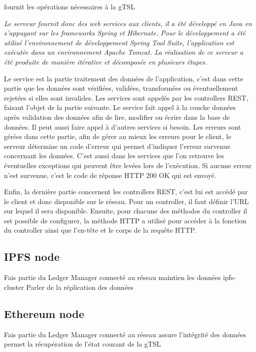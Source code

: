 \documentclass{tnreport}
\begin{document}
fournit les opérations nécessaires à la gTSL
{\em
Le serveur fournit donc des web services aux clients, il a été développé en Java en
s'appuyant sur les frameworks Spring et Hibernate. Pour le développement a été utilisé
l'environnement de développement Spring Tool Suite, l'application est exécutée dans un
environnement Apache Tomcat. La réalisation de ce serveur a été produite de manière itérative et
décomposée en plusieurs étapes.

Le service est la partie traitement des données de l'application, c'est dans
cette partie que les données sont vérifiées, validées, transformées ou éventuellement rejetées si elles
sont invalides. Les services sont appelés par les controllers REST, faisant l'objet de la partie
suivante. Le service fait appel à la couche données après validation des données afin de lire, modifier ou
écrire dans la base de données. Il peut aussi faire appel à d'autres services si besoin. Les erreurs sont
gérées dans cette partie, afin de gérer au mieux les erreurs pour le client, le serveur détermine un
code d'erreur qui permet d'indiquer l'erreur survenue concernant les données. C'est aussi dans les
services que l'on retrouve les éventuelles exceptions qui peuvent être levées lors de l'exécution.
Si aucune erreur n'est survenue, c'est le code de
réponse HTTP 200 OK qui est envoyé.

Enfin, la dernière partie concernent les controllers REST, c'est lui est accédé par le client et donc disponible sur le réseau. Pour un controller, il faut définir
l'URL sur lequel il sera disponible. Ensuite, pour chacune des méthodes du controller il est possible
de configurer, la méthode HTTP a utilisé pour accéder à la fonction du controller ainsi que l'en-tête et le corps de la requête HTTP.
}

\subsection{IPFS node}

Fais partie du Ledger Manager
connecté au réseau
maintien les données
ipfs-cluster
Parler de la réplication des données

\subsection{Ethereum node}

Fais partie du Ledger Manager
connecté au réseau
assure l'intégrité des données
permet la récupération de l'état courant de la gTSL
\end{document}
